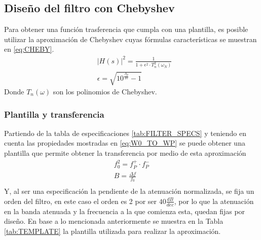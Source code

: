 \subsection{Dise\~no del filtro con Chebyshev}
Para obtener una funci\'on trasferencia que cumpla con una plantilla, es posible utilizar la aproximaci\'on de Chebyshev cuyas f\'ormulas caracter\'isticas se muestran en \ref{eq:CHEBY}.
\begin{equation}
    \begin{split}
        &|H(s)|^2 = \frac{1}{1+\epsilon^2 \cdot T_n^2(\omega_N)}\\  
        &\epsilon = \sqrt{10^{\frac{A_p}{10}}-1}
    \end{split}
    \label{eq:CHEBY}
\end{equation}
Donde $T_n(\omega)$ son los polinomios de Chebyshev.
\subsubsection{Plantilla y transferencia}
Partiendo de la tabla de especificaciones \ref{tab:FILTER_SPECS} y teniendo en cuenta las propiedades mostradas en \ref{eq:W0_TO_WP}
se puede obtener una plantilla que permite obtener la transferencia por medio de esta aproximaci\'on
\begin{equation}
    \begin{split}
        f_0^2=f_P^+ \cdot f_P^-\\
        B=\frac{\Delta f}{f_0}\\
    \end{split}
    \label{eq:CHEBY}
\end{equation}
Y, al ser una especificaci\'on la pendiente de la atenuaci\'on normalizada, se fija un orden del filtro, en este caso el orden es 2 por ser $40\frac{dB}{dec}$, por lo que la atenuaci\'on en la banda atenuada y la frecuencia a la que comienza esta, quedan fijas por dise\~no.
En base a lo mencionada anteriormente se muestra en la Tabla \ref{tab:TEMPLATE} la plantilla utilizada para realizar la aproximaci\'on.
\begin{table}[H]
    \centering
    \caption{Plantilla del filtro}
    \label{tab:TEMPLATE}
    \end{table}

